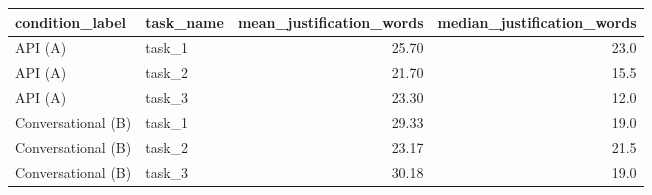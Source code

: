 \begin{tabular}{llrr}
\toprule
   condition_label & task_name &  mean_justification_words &  median_justification_words \\
\midrule
           API (A) &    task_1 &                     25.70 &                        23.0 \\
           API (A) &    task_2 &                     21.70 &                        15.5 \\
           API (A) &    task_3 &                     23.30 &                        12.0 \\
Conversational (B) &    task_1 &                     29.33 &                        19.0 \\
Conversational (B) &    task_2 &                     23.17 &                        21.5 \\
Conversational (B) &    task_3 &                     30.18 &                        19.0 \\
\bottomrule
\end{tabular}
